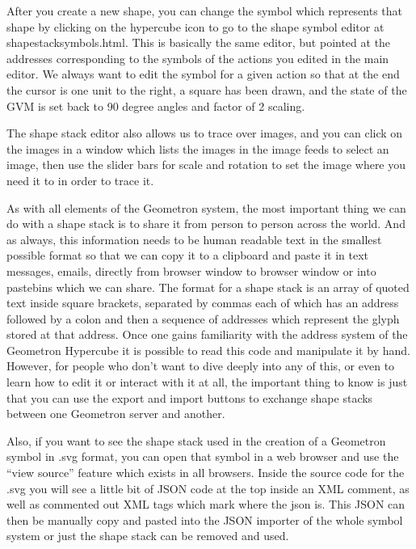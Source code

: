 After you create a new shape, you can change the symbol which represents that shape by clicking on the hypercube icon to go to the shape symbol editor at shapestacksymbols.html.  This is basically the same editor, but pointed at the addresses corresponding to the symbols of the actions you edited in the main editor.  We always want to edit the symbol for a given action so that at the end the cursor is one unit to the right, a square has been drawn, and the state of the GVM is set back to 90 degree angles and factor of 2 scaling.  

The shape stack editor also allows us to trace over images, and you can click on the images in a window which lists the images in the image feeds to select an image, then use the slider bars for scale and rotation to set the image where you need it to in order to trace it.  

As with all elements of the Geometron system, the most important thing we can do with a shape stack is to share it from person to person across the world.  And as always, this information needs to be human readable text in the smallest possible format so that we can copy it to a clipboard and paste it in text messages, emails, directly from browser window to browser window or into pastebins which we can share.  The format for a shape stack is an array of quoted text inside square brackets, separated by commas each of which has an address followed by a colon and then a sequence of addresses which represent the glyph stored at that address.  Once one gains familiarity with the address system of the Geometron Hypercube it is possible to read this code and manipulate it by hand.  However, for people who don't want to dive deeply into any of this, or even to learn how to edit it or interact with it at all, the important thing to know is just that you can use the export and import buttons to exchange shape stacks between one Geometron server and another.  

Also, if you want to see the shape stack used in the creation of a Geometron symbol in .svg format, you can open that symbol in a web browser and use the ``view source'' feature which exists in all browsers. Inside the source code for the .svg you will see a little bit of JSON code at the top inside an XML comment, as well as commented out XML tags which mark where the json is.  This JSON can then be manually copy and pasted into the JSON importer of the whole symbol system or just the shape stack can be removed and used.

